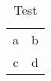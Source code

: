 \documentclass{beamer}
\begin{document}
\begin{frame}
\begin{table}
\begin{tabular}{cc}
a & b \\
c & d
\end{tabular}
\caption{Test}
\end{table}
\end{frame}
\end{document}
